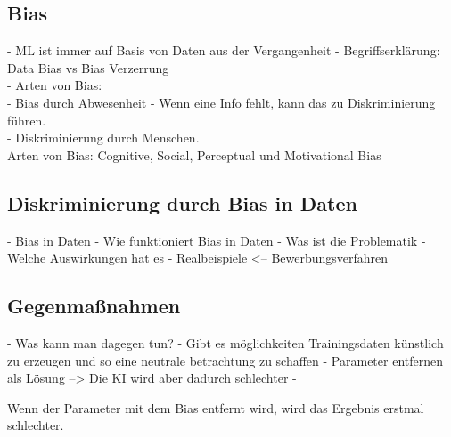 \begin{onehalfspace}
    \subsection{Bias}
    \label{subsubsec:Bias}
        - ML ist immer auf Basis von Daten aus der Vergangenheit 
        -   Begriffserklärung: Data Bias vs Bias Verzerrung\\
        -   Arten von Bias: \\
            -   Bias durch Abwesenheit - Wenn eine Info fehlt, kann das zu Diskriminierung führen. \\
            -   Diskriminierung durch Menschen. \\
        Arten von Bias: Cognitive, Social, Perceptual und Motivational Bias \cite{HEGKI2019Definition}\cite{Parkavi2018}

    \subsection{Diskriminierung durch Bias in Daten}
    \label{subsubsec:diskriminierungdurchverzerrung}
        - Bias in Daten
        - Wie funktioniert Bias in Daten
        - Was ist die Problematik
        - Welche Auswirkungen hat es 
        - Realbeispiele <-- Bewerbungsverfahren
        \cite{IncidentDatabase2015}

    \subsection{Gegenma{\ss}nahmen}
    \label{subsubsec:gegenmassnahmen}
        - Was kann man dagegen tun?
        - Gibt es möglichkeiten Trainingsdaten künstlich zu erzeugen und so eine neutrale betrachtung zu schaffen
        - Parameter entfernen als Lösung --> Die KI wird aber dadurch schlechter 
        - 

        Wenn der Parameter mit dem Bias entfernt wird, wird das Ergebnis erstmal schlechter. 
        
    \newpage
\end{onehalfspace}